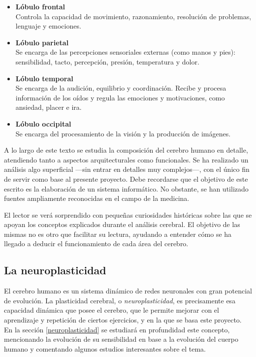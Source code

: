 \begin{itemize}
\item {\bf Lóbulo frontal}\\
Controla la capacidad de movimiento, razonamiento, resolución de problemas, lenguaje y emociones.
\item {\bf Lóbulo parietal}\\
Se encarga de las percepciones sensoriales externas (como manos y pies): sensibilidad, tacto, percepción, presión, temperatura y dolor.
\item {\bf Lóbulo temporal}\\
Se encarga de la audición, equilibrio y coordinación. Recibe y procesa información de los oídos y regula las emociones y motivaciones, como ansiedad, placer e ira.
\item {\bf Lóbulo occipital}\\
Se encarga del procesamiento de la visión y la producción de imágenes.
\end{itemize}

A lo largo de este texto se estudia la composición del cerebro humano en detalle, atendiendo tanto a aspectos arquitecturales como funcionales. Se ha realizado un análisis algo superficial ---sin entrar en detalles muy complejos---, con el único fin de servir como base al presente proyecto. Debe recordarse que el objetivo de este escrito es la elaboración de un sistema informático. No obstante, se han utilizado fuentes ampliamente reconocidas en el campo de la medicina.

El lector se verá sorprendido con pequeñas curiosidades históricas sobre las que se apoyan los conceptos explicados durante el análisis cerebral. El objetivo de las mismas no es otro que facilitar su lectura, ayudando a entender cómo se ha llegado a deducir el funcionamiento de cada área del cerebro.

\subsection{La neuroplasticidad}
\label{sec::neuroplasticidad}

El cerebro humano es un sistema dinámico de redes neuronales con gran potencial de evolución. La plasticidad cerebral, o {\it neuroplasticidad}, es precisamente esa capacidad dinámica que posee el cerebro, que le permite mejorar con el aprendizaje y repetición de ciertos ejercicios, y en la que se basa este proyecto. En la sección \ref{neuroplasticidad} se estudiará en profundidad este concepto, mencionando la evolución de su sensibilidad en base a la evolución del cuerpo humano y comentando algunos estudios interesantes sobre el tema.

